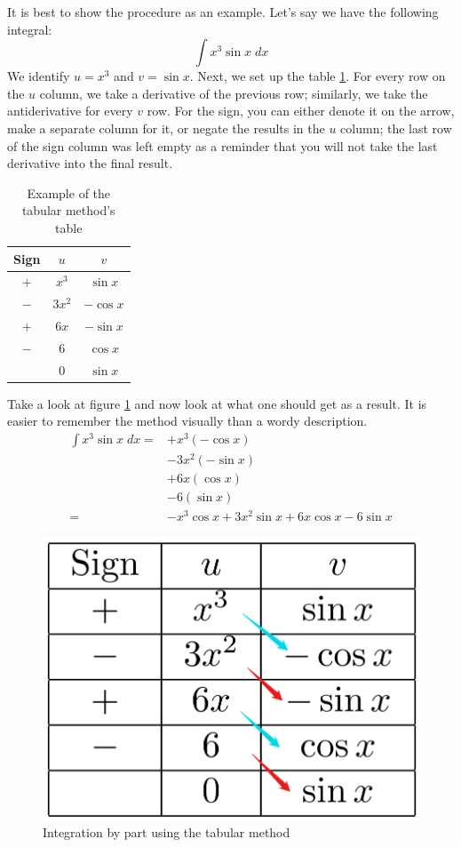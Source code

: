 It is best to show the procedure as an example. Let's say we have the following integral:
\[ \int x^3\sin x \;dx \]
We identify $u=x^3$ and $v=\sin x$. Next, we set up the table \ref{tab:m3}. For every row on the $u$ column, we take a derivative of the previous row; similarly, we take the antiderivative for every $v$ row. For the sign, you can either denote it on the arrow, make a separate column for it, or negate the results in the $u$ column; the last row of the sign column was left empty as a reminder that you will not take the last derivative into the final result.
\begin{table}
    \centering
    \begin{tabular}{|c|c|c|} \hline 
          Sign&$u$& $v$\\ \hline 
          $+$&$x^3$& $\sin x$\\ \hline 
          $-$&$3x^2$& $-\cos x$\\ \hline 
          $+$&$6x$& $-\sin x$\\ \hline 
          $-$&$6$& $\cos x$\\ \hline
          &$0$& $\sin x$\\ \hline
    \end{tabular}
    \caption{Example of the tabular method's table}
    \label{tab:m3}
\end{table}

Take a look at figure \ref{fig:m16} and now look at what one should get as a result. It is easier to remember the method visually than a wordy description.
\[\begin{aligned}
    \int x^3\sin x \;dx =
    &+ x^3 (-\cos x) \\
    &- 3x^2 (-\sin x) \\
    &+ 6x (\cos x) \\
    &- 6 (\sin x) \\
    =& -x^3\cos x + 3x^2\sin x + 6x\cos x - 6\sin x
\end{aligned}\]
\begin{figure}
    \centering
    \includegraphics[width=0.4\linewidth]{math/16.png}
    \caption{Integration by part using the tabular method}
    \label{fig:m16}
\end{figure}

